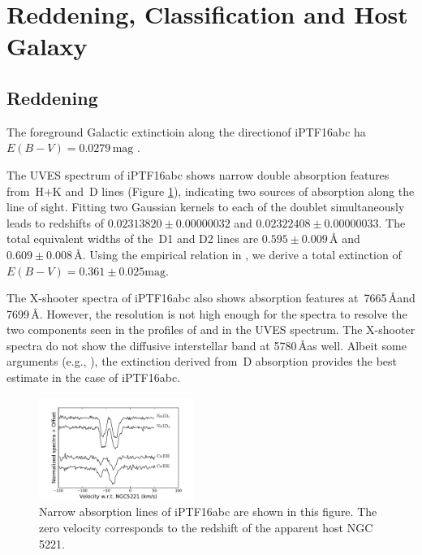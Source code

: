 \documentclass[twocolumn]{aastex61}
\begin{document}
\section{Reddening, Classification and Host Galaxy}
\label{sec:usual_staff}

\subsection{Reddening}
\label{sec:reddening}

The foreground Galactic extinctioin along the directionof iPTF16abc ha
$E(B-V)=0.0279\,\textrm{mag}$ \citep{2011ApJ...737..103S}. 

The UVES spectrum of iPTF16abc shows narrow double absorption features
from \,H$+$K and \,D lines (Figure
\ref{fig:narrow_features}), indicating two sources of absorption along
the line of sight. Fitting two Gaussian kernels to each of
the  doublet simultaneously leads to redshifts of
$0.02313820\pm0.00000032$ and $0.02322408\pm0.00000033$. The total
equivalent widths of the \,D1 and D2 lines are
$0.595\pm0.009\,\textrm{\AA}$ and $0.609\pm0.008\,\textrm{\AA}$.
Using the empirical relation in \citet{2012MNRAS.426.1465P}, we derive
a total extinction of $E(B-V)=0.361\pm0.025\textrm{mag}$.

The X-shooter spectra of iPTF16abc also shows absorption features at
\,7665\,\AA and 7699\,\AA. However, the resolution is not
high enough for the spectra to resolve the two components seen in the
profiles of  and  in the UVES spectrum. The
X-shooter spectra do not show the diffusive interstellar band at
5780\,\AA as well.  Albeit some arguments (e.g.,
\citealt{2013ApJ...779...38P}), the extinction derived from
\,D absorption provides the best estimate in the case of
iPTF16abc.

\begin{figure}[htb]
  \centering
  \includegraphics[width=0.45\textwidth]{narrow_abs_features.pdf}
  \caption{Narrow absorption lines of iPTF16abc are shown in this
    figure. The zero velocity corresponds to the redshift of the
    apparent host NGC\,5221.}
  \label{fig:narrow_features}
\end{figure}
\end{document}
